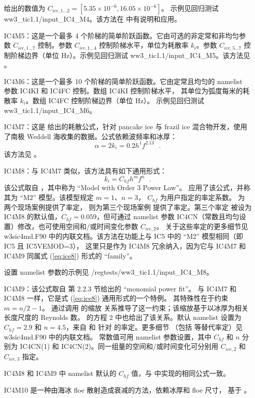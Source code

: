 \cite{art:Ko14} 给出的数值为 ${C_{ice,1...2}}=[5.35\times 10^{-6}, 16.05\times 10^{-6}]$。
示例见回归测试 {\file ww3\_tic1.1/input\_IC4\_M4}。该方法在 \cite{rep:CR17}
中有说明和应用。

{\code IC4M5}：这是一个最多 4 个阶梯的简单阶跃函数。它由可选的非定常和非均匀参数
${C_{ice,1...7}}$ 控制。参数 ${C_{ice,1...4}}$ 控制阶梯水平，单位为耗散率
${k_i}$。参数 ${C_{ice,5...7}}$ 控制阶梯边界（单位 Hz）。示例见回归测试
{\file ww3\_tic1.1/input\_IC4\_M5}。该方法见 \cite{rep:CR17}。

{\code IC4M6}：这是一个最多 10 个阶梯的简单阶跃函数。它由定常且均匀的 namelist
参数 {\code IC4KI} 和 {\code IC4FC} 控制。数组 {\code IC4KI} 控制阶梯水平，
其单位为弧度每米的耗散率 ${k_i}$。数组 {\code IC4FC} 控制阶梯边界（单位 Hz）。
示例见回归测试 {\file ww3\_tic1.1/input\_IC4\_M6}。

{\code IC4M7}：这是 \cite{art:Dob15} 给出的耗散公式，针对 pancake ice 与 frazil ice
混合物开发，使用了南极 Weddell 海收集的数据。公式依赖波频率和冰厚：
\begin{equation}\label{eq:ice7}
  {\alpha=2k_i=0.2h^1f^{2.13}} \:\:\: .
\end{equation}
该方法见 \cite{rep:RPLA18}。

{\code IC4M8}：与 {\code IC4M7} 类似，该方法具有如下通用形式：
\begin{equation}\label{eq:ice8}
  {k_i=C_{hf}h^mf^n} \:\:\: .
\end{equation}
该公式取自 \cite{Meylan2018}，其中称为 ``Model with Order 3 Power Law''。
\cite{Liu2020} 应用了该公式，并称其为 ``M2'' 模型。该模型规定 $m=1$、$n=3$，
$C_{hf}$ 为用户指定的率定系数。\cite{Liu2020} 为两个现场案例提供了率定，
\cite{rep:RYW2021} 则为第三个现场案例 \cite{art:RMK2021} 提供了率定。第三个率定
被设为 {\code IC4M8} 的默认值，$C_{hf}=0.059$，但可通过 namelist 参数
{\code IC4CN}（常数且均匀设置）修改，也可使用空间和/或时间变化参数 ${C_{ice,2}}$。
关于这些率定的更多细节见 {\file w3sic4md.F90} 中的内联文档。该方法在功能上与
{\code IC5} 中的 ``{\code M2}'' 模型相同（即 {\code IC5} 且 {\code IC5VEMOD=3}），
这里只是作为 {\code IC4M8} 冗余纳入，因为它与 {\code IC4M7} 和 {\code IC4M9}
同属式 (\ref{eq:ice8}) 形式的 ``family''。

设置 namelist 参数的示例见 {\file /regtests/ww3\_tic1.1/input\_IC4\_M8}。

{\code IC4M9}：该公式取自 \cite{rep:RYW2021} 第 2.2.3 节给出的 ``monomial power fit''。
与 {\code IC4M7} 和 {\code IC4M8} 一样，它是式 (\ref{eq:ice8}) 通用形式的一个特例。
其特殊性在于约束 $m=n/2-1$。\cite{rep:RYW2021} 通过调用 \cite{art:YRW2019} 的缩放
关系推导了这一约束；该缩放基于以冰厚为相关长度尺度的 Reynolds 数。\cite{art:YRW2022}
的方程 2 中也给出了该关系。默认 namelist 设置为 $C_{hf}=2.9$ 和 $n=4.5$，来自
\cite{rep:RYW2021} 和 \cite{art:YRW2022} 针对 \cite{art:RMK2021} 的率定。更多细节
（包括 \cite{art:Yu2022} 等替代率定）见 {\file w3sic4md.F90} 中的内联文档。
常数值可用 namelist 参数设置，其中 $C_{hf}$ 和 $n$ 分别为 {\code IC4CN(1)}
和 {\code IC4CN(2)}。同一组量的空间和/或时间变化可分别用 ${C_{ice,2}}$ 和
${C_{ice,3}}$ 指定。

{\code IC4M8} 和 {\code IC4M9} 中 namelist 默认的 $C_{hf}$ 值，与
\cite{man:SWAN4145A} 中实现的相同公式一致。

{\code IC4M10} 是一种由海冰 floe 散射造成衰减的方法，依赖冰厚和 floe 尺寸，
基于 \cite{art:MHB21}。
